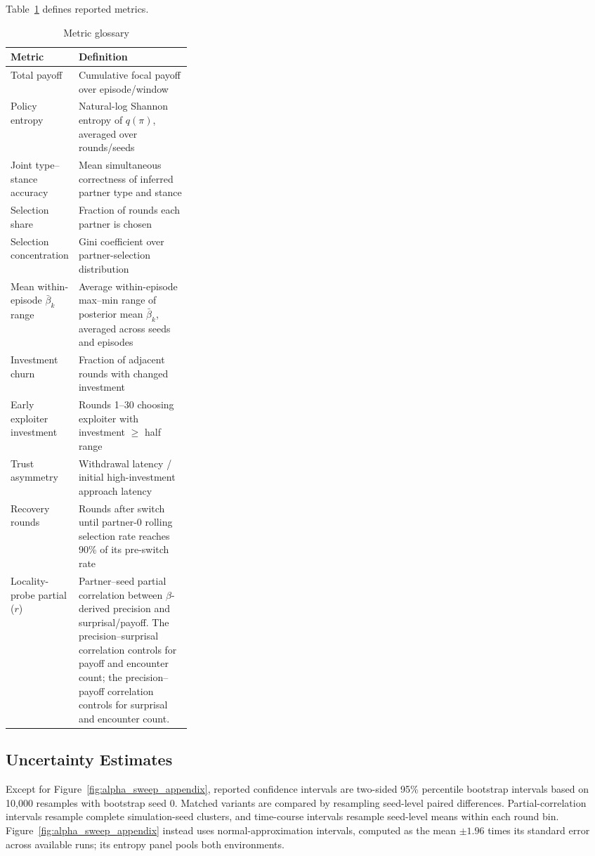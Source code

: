 \documentclass[runningheads,orivec]{llncs}
\begin{document}
Table~\ref{tab:metrics_glossary} defines reported metrics.

\begin{table}[H]
\centering
\small
\caption{Metric glossary}
\label{tab:metrics_glossary}
\begin{tabularx}{\linewidth}{@{}>{\raggedright\arraybackslash}p{0.30\linewidth}>{\raggedright\arraybackslash}X@{}}
\toprule
Metric & Definition \\
\midrule
Total payoff & Cumulative focal payoff over episode/window \\
Policy entropy & Natural-log Shannon entropy of $q(\pi)$, averaged over rounds/seeds \\
Joint type--stance accuracy & Mean simultaneous correctness of inferred partner type and stance \\
Selection share & Fraction of rounds each partner is chosen \\
Selection concentration & Gini coefficient over partner-selection distribution \\
Mean within-episode $\bar{\beta}_k$ range & Average within-episode max--min range of posterior mean $\bar{\beta}_k$, averaged across seeds and episodes \\
Investment churn & Fraction of adjacent rounds with changed investment \\
Early exploiter investment & Rounds 1--30 choosing exploiter with investment $\geq$ half range \\
Trust asymmetry & Withdrawal latency / initial high-investment approach latency \\
Recovery rounds & Rounds after switch until partner-0 rolling selection rate reaches 90\% of its pre-switch rate \\
Locality-probe partial (\(r\)) & Partner--seed partial correlation between $\beta$-derived precision and surprisal/payoff. The precision--surprisal correlation controls for payoff and encounter count; the precision--payoff correlation controls for surprisal and encounter count. \\
\bottomrule
\end{tabularx}
\end{table}

\subsection{Uncertainty Estimates}

Except for Figure~\ref{fig:alpha_sweep_appendix}, reported confidence intervals are two-sided 95\% percentile bootstrap intervals based on 10,000 resamples with bootstrap seed 0. Matched variants are compared by resampling seed-level paired differences. Partial-correlation intervals resample complete simulation-seed clusters, and time-course intervals resample seed-level means within each round bin. Figure~\ref{fig:alpha_sweep_appendix} instead uses normal-approximation intervals, computed as the mean $\pm 1.96$ times its standard error across available runs; its entropy panel pools both environments.
\end{document}
